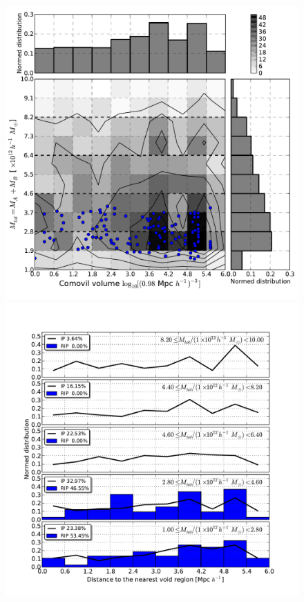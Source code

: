 \documentclass[a4,useAMS,usenatbib,usegraphicx]{latex/mn2e}
\begin{document}
\begin{flushleft}
\begin{figure}
\begin{center}

  \includegraphics[trim = 2mm 9mm 3mm 4mm, clip, keepaspectratio=true,
  width=0.36\textheight]{./figures/2D_totalmass_vvolume_BDM_Tweb}
  \includegraphics[trim = 4mm 9mm 17mm 15mm, clip, keepaspectratio=true,
  width=0.36\textheight]{./figures/single_totalmass_vvolume_BDM_Tweb}
  

\end{center}
\end{figure}
\end{flushleft}
\end{document}
